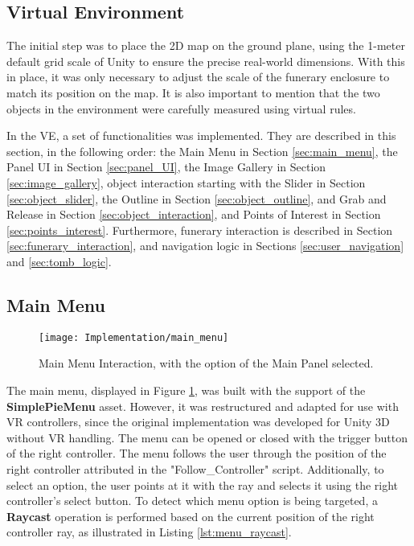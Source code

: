\subsection{Virtual Environment}
The initial step was to place the \gls{2D} map on the ground plane, using the 1-meter default grid scale of Unity to ensure the precise real-world dimensions. With this in place, it was only necessary to adjust the scale of the funerary enclosure to match its position on the map. It is also important to mention that the two objects in the environment were carefully measured using virtual rules.

In the \gls{VE}, a set of functionalities was implemented. 
They are described in this section, in the following order: the Main Menu in Section \ref{sec:main_menu}, the Panel \gls{UI} in Section \ref{sec:panel_UI}, the Image Gallery in Section \ref{sec:image_gallery}, object interaction starting with the Slider in Section \ref{sec:object_slider}, the Outline in Section \ref{sec:object_outline}, and Grab and Release in Section \ref{sec:object_interaction}, and Points of Interest in Section \ref{sec:points_interest}. 
Furthermore, funerary interaction is described in Section \ref{sec:funerary_interaction}, and navigation logic in Sections \ref{sec:user_navigation} and \ref{sec:tomb_logic}.

\subsection*{Main Menu}
\label{sec:main_menu}

 \begin{figure}[h!]
    \centering
    \texttt{[image: Implementation/main\_menu]}
    \caption{Main Menu Interaction, with the option of the Main Panel selected.}
    \label{fig:main_menu}
\end{figure}

The main menu, displayed in Figure \ref{fig:main_menu}, was built with the support of the \textbf{SimplePieMenu} asset.
However, it was restructured and adapted for use with \gls{VR} controllers, since the original implementation was developed for Unity \gls{3D} without \gls{VR} handling.
The menu can be opened or closed with the trigger button of the right controller. The menu follows the user through the position of the right controller attributed in the "Follow\_Controller" script.
Additionally, to select an option, the user points at it with the ray and selects it using the right controller’s select button. To detect which menu option is being targeted, a \textbf{Raycast} operation is performed based on the current position of the right controller ray, as illustrated in Listing \ref{lst:menu_raycast}.

